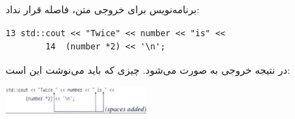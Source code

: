 \section{}
\paragraph{}\label{answer:23}
برنامه‌نویس برای خروجی متن، فاصله قرار نداد:
\begin{LTR}
    \begin{lstlisting}[style=C++Style]
        13 std::cout << "Twice" << number << "is" <<
        14 	(number *2) << '\n';
    \end{lstlisting}
\end{LTR}

در نتیجه خروجی به صورت  می‌شود. چیزی که باید می‌نوشت این است:
\begin{flushleft}
    \includegraphics[keepaspectratio,width=0.4\textwidth,height=0.4\textheight]{images/image01.jpg}
\end{flushleft}
